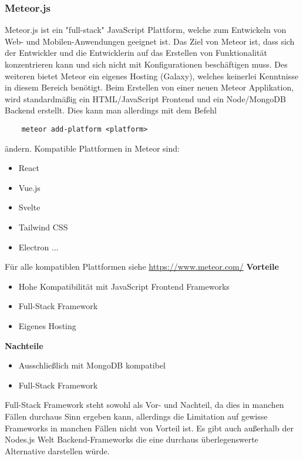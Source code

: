 \subsubsection{Meteor.js}
Meteor.js ist ein "full-stack" JavaScript Plattform, welche zum Entwickeln von Web- und Mobilen-Anwendungen geeignet ist. Das Ziel von Meteor ist, dass sich der Entwickler und die Entwicklerin auf das Erstellen von Funktionalität konzentrieren kann und sich nicht mit Konfigurationen beschäftigen muss. Des weiteren bietet Meteor ein eigenes Hosting (Galaxy), welches keinerlei Kenntnisse in diesem Bereich benötigt. 
\newline
Beim Erstellen von einer neuen Meteor Applikation, wird standardmäßig ein HTML/JavaScript Frontend und ein Node/MongoDB Backend erstellt. Dies kann man allerdings mit dem Befehl
\begin{verbatim}
    meteor add-platform <platform>
\end{verbatim}
ändern. Kompatible Plattformen in Meteor sind:
\begin{itemize}
    \item React
    \item Vue.js
    \item Svelte
    \item Tailwind CSS
    \item Electron ...
\end{itemize}
Für alle kompatiblen Plattformen siehe \url{https://www.meteor.com/}
\newline
\textbf{Vorteile}
\begin{itemize}
    \item Hohe Kompatibilität mit JavaScript Frontend Frameworks
    \item Full-Stack Framework
    \item Eigenes Hosting
\end{itemize}
\textbf{Nachteile}
\begin{itemize}
    \item Ausschließlich mit MongoDB kompatibel
    \item Full-Stack Framework
\end{itemize}
Full-Stack Framework steht sowohl als Vor- und Nachteil, da dies in manchen Fällen durchaus Sinn ergeben kann, allerdings die Limitation auf gewisse Frameworks in manchen Fällen nicht von Vorteil ist.
\cite{backend_meteor}
\cite{backend_meteor_1}
\newline
Es gibt auch außerhalb der Nodes.js Welt Backend-Frameworks die eine durchaus überlegenswerte Alternative darstellen würde.

